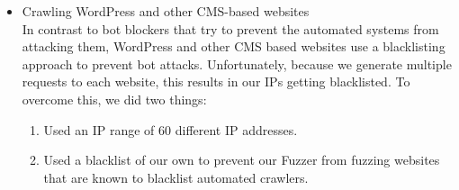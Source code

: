 \begin{itemize}
	\item Crawling WordPress and other CMS-based websites\\
	\label{issues:cms}
	In contrast to bot blockers that try to prevent the automated systems from attacking them, WordPress and other CMS based websites use a blacklisting approach to prevent bot attacks. Unfortunately, because we generate multiple requests to each website, this results in our IPs getting blacklisted. To overcome this, we did two things:
	\begin{enumerate}
		\item Used an IP range of 60 different IP addresses. 
		\item Used a blacklist of our own to prevent our Fuzzer from fuzzing websites that are known to blacklist automated crawlers.
	\end{enumerate}
\end{itemize}